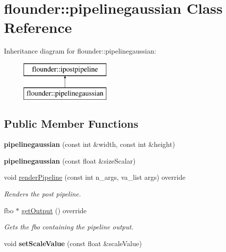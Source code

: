 \hypertarget{classflounder_1_1pipelinegaussian}{}\section{flounder\+:\+:pipelinegaussian Class Reference}
\label{classflounder_1_1pipelinegaussian}
Inheritance diagram for flounder\+:\+:pipelinegaussian\+:\begin{figure}[H]
\begin{center}
\leavevmode
\includegraphics[height=2.000000cm]{classflounder_1_1pipelinegaussian}
\end{center}
\end{figure}
\subsection*{Public Member Functions}
\begin{DoxyCompactItemize}
\item 
\mbox{\label{classflounder_1_1pipelinegaussian_a77e6dea87b6a7b14184c08449e9b965a}} 
{\bfseries pipelinegaussian} (const int \&width, const int \&height)
\item 
\mbox{\label{classflounder_1_1pipelinegaussian_a54aada433e11cfe54917179803ba9038}} 
{\bfseries pipelinegaussian} (const float \&size\+Scalar)
\item 
void \hyperlink{classflounder_1_1pipelinegaussian_ab5416e0179e9b6175c8e59c07300d253}{render\+Pipeline} (const int n\+\_\+args, va\+\_\+list args) override
\begin{DoxyCompactList}\small\item\em Renders the post pipeline. \end{DoxyCompactList}\item 
fbo $\ast$ \hyperlink{classflounder_1_1pipelinegaussian_aae27c8214a8a544b1ab96ddd2383a2b2}{get\+Output} () override
\begin{DoxyCompactList}\small\item\em Gets the fbo containing the pipeline output. \end{DoxyCompactList}\item 
\mbox{\label{classflounder_1_1pipelinegaussian_a3d05857ef2339b8ec0b974b3d6b08871}} 
void {\bfseries set\+Scale\+Value} (const float \&scale\+Value)
\end{DoxyCompactItemize}
